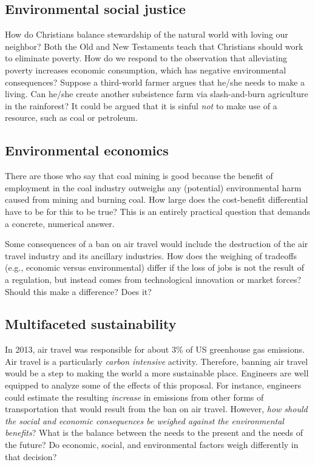 \documentclass[12pt]{article}
\begin{document}
\subsection{Environmental social justice}
How do Christians balance stewardship of the natural world with loving our neighbor?
Both the Old and New Testaments teach that Christians should work to eliminate poverty. 
How do we respond to the observation that alleviating poverty increases economic consumption, which has negative environmental consequences?
Suppose a third-world farmer argues that he/she needs to make a living. 
Can he/she create another subsistence farm via slash-and-burn agriculture in the rainforest?  
It could be argued that it is sinful \emph{not} to make use of a resource, such as coal or petroleum. 


\subsection{Environmental economics}
There are those who say that coal mining is good because the benefit of employment in the coal industry outweighs
any (potential) environmental harm caused from mining and burning coal. How large does the cost-benefit differential
have to be for this to be true? This is an entirely practical question that demands a concrete, numerical answer.

Some consequences of a ban on air travel would include the destruction of the air travel industry and its ancillary
industries. How does the weighing of tradeoffs (e.g., economic versus environmental) differ if the loss of jobs is not
the result of a regulation, but instead comes from technological innovation or market forces? Should this make a
difference? Does it?

\subsection{Multifaceted sustainability}
In 2013, air travel was responsible for about 3\% of US greenhouse gas emissions. %
Air travel is a particularly \emph{carbon intensive} activity. Therefore, banning air travel would be a step to making the 
world a more sustainable place. Engineers are well equipped to analyze some of the effects of this proposal. For instance,
engineers could estimate the resulting \emph{increase} in emissions from other forms of transportation that would result from 
the ban on air travel. However, \emph{how should the social and economic consequences be weighed against the environmental 
benefits}? What is the balance between the needs to the present and the needs of the future?	
Do economic, social, and environmental factors weigh differently in that decision?	
\end{document}

